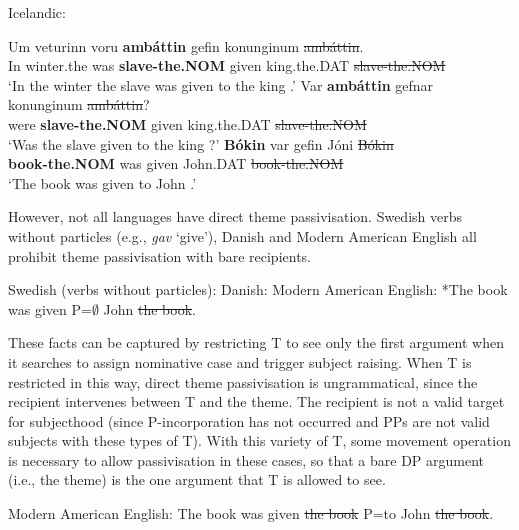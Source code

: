 \begin{exe}
	\ex Icelandic:\label{ex:ice-directthe}
\begin{xlist}
	\ex \gll Um veturinn voru \textbf{amb\'{a}ttin} gefin konunginum \sout{amb\'{a}ttin}.\\
	In winter.the was \textbf{slave-the.NOM} given king.the.DAT \sout{slave-the.NOM}\\
\trans `In the winter the slave was given to the king \citep[ex. 47b]{Zaenen.1985}.'
\ex \gll Var \textbf{amb\'{a}ttin} gefnar konunginum \sout{amb\'{a}ttin}?\\
were \textbf{slave-the.NOM} given king.the.DAT \sout{slave-the.NOM}\\
\trans `Was the slave given to the king \citep[ex. 48b]{Zaenen.1985}?'
\ex \gll \textbf{B\'{o}kin} var gefin J\'{o}ni \sout{B\'{o}kin}\\
\textbf{book-the.NOM} was given John.DAT \sout{book-the.NOM}\\
\trans `The book was given to John \citep{Holmberg.1995,Bardal.2001}.'
\end{xlist}
\end{exe}

However, not all languages have direct theme passivisation. Swedish verbs without particles (e.g., \textit{gav} `give'), Danish and Modern American English all prohibit theme passivisation with bare recipients.

\begin{exe}
	\ex Swedish (verbs without particles):\label{ex:swe-nopart-pass}
	 \ex Danish:\label{ex:dan-pass}
\ex Modern American English: *The book was given P=$\emptyset$ John \sout{the book}.\label{ex:amen-pass}
\end{exe}

These facts can be captured by restricting T to see only the first argument when it searches to assign nominative case and trigger subject raising. When T is restricted in this way, direct theme passivisation is ungrammatical, since the recipient intervenes between T and the theme. The recipient is not a valid target for subjecthood (since P-incorporation has not occurred and PPs are not valid subjects with these types of T). With this variety of T, some movement operation is necessary to allow passivisation in these cases, so that a bare DP argument (i.e., the theme) is the one argument that T is allowed to see.  
\begin{exe}
	\ex Modern American English: The book was given \sout{the book} P=to John \sout{the book}.\label{ex:amen-thepass}
\end{exe}

